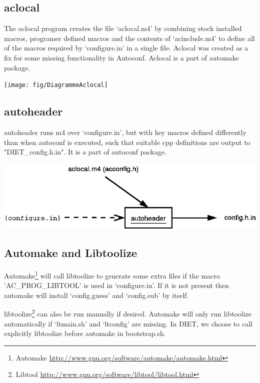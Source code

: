 \subsection{aclocal}
The aclocal program creates the file `aclocal.m4' by combining stock installed
macros, programer defined macros and the contents of `acinclude.m4' to define all
of the macros required by `configure.in' in a single file. Aclocal was 
created as a fix for some missing functionality in Autoconf. Aclocal is a part of
automake package.

\begin{center}
\texttt{[image: fig/DiagrammeAclocal]}
\end{center}

\subsection{autoheader}
autoheader runs m4 over `configure.in', but with key macros defined differently
than when autoconf is executed, such that suitable cpp definitions are output
to "DIET\_config.h.in". It is a part of autoconf package.

\begin{center}
\includegraphics[scale=.35]{fig/DiagrammeAutoheader}
\end{center}

\subsection{Automake and Libtoolize}
Automake\footnote{Automake {\url{http://www.gnu.org/software/automake/automake.html}}} 
will call libtoolize to generate some extra files if the macro 
'AC\_PROG\_LIBTOOL' is used in `configure.in'. If it is not present 
then automake will install `config.guess' and `config.sub' by itself.

libtoolize\footnote{Libtool {\url{http://www.gnu.org/software/libtool/libtool.html}}}
can also be run manually if desired. 
Automake will only run libtoolize automatically if `ltmain.sh' and `ltconfig' 
are missing. In DIET, we choose to call explicitly libtoolize before automake
in bootstrap.sh.

